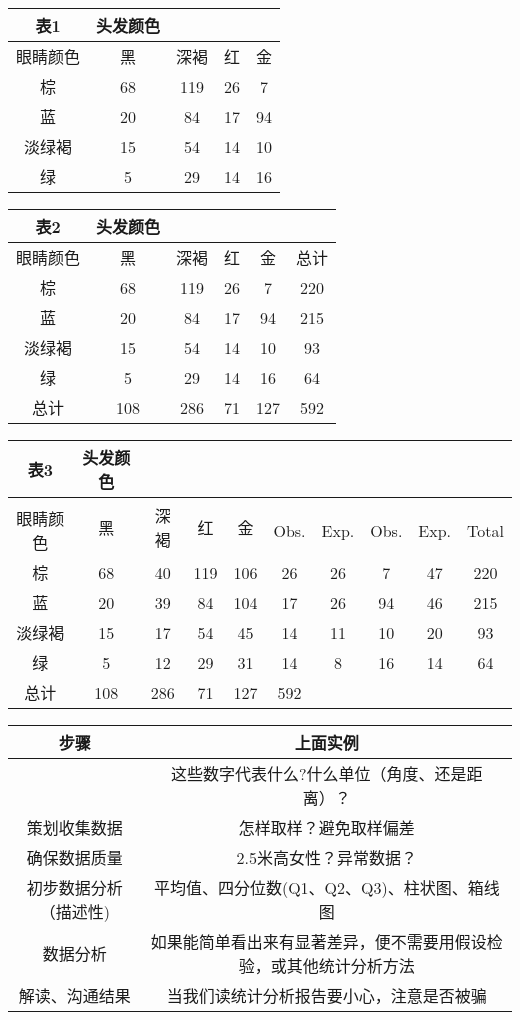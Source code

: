 \documentclass{book}        %
\begin{document}
\begin{tabular}{|c|c|c|c|c|}
\hline
表1&\multirow{4}{*}{头发颜色 }\\
\hline
眼睛颜色&黑&深褐&红&金\\
\hline
棕&68&119&26&7\\
\hline
蓝&20&84&17&94\\
\hline
淡绿褐&15&54&14&10\\
\hline
绿&5&29&14&16\\
\hline
\end{tabular}


\begin{tabular}{|c|c|c|c|c|c|}
\hline
表2&\multirow{5}{*}{头发颜色 }\\
\hline
眼睛颜色&黑&深褐&红&金&总计\\
\hline
棕&68&119&26&7&220\\
\hline
蓝&20&84&17&94&215\\
\hline
淡绿褐&15&54&14&10&93\\
\hline
绿&5&29&14&16&64\\
\hline
总计&108&286&71&127&592\\
\hline
\end{tabular}



\begin{tabular}{|c|c|c|c|c|c|c|c|c|c|}
\hline
表3&\multirow{8}{*}{头发颜色 }&\:\\
\hline
\:&\multirow{2}{*}{黑}&\multirow{2}{*}{深褐}&\multirow{2}{*}{红}&\multirow{2}{*}{金}&\:\\
\hline
眼睛颜色&Obs.&Exp.&Obs.&Exp.&Obs.&Exp.&Obs.&Exp.&Total\\
\hline
棕&68&40&119&106&26&26&7&47&220\\
\hline
蓝&20&39&84&104&17&26&94&46&215\\
\hline
淡绿褐&15&17&54&45&14&11&10&20&93\\
\hline
绿&5&12&29&31&14&8&16&14&64\\
\hline
总计&\multirow{2}{*}{108}&\multirow{2}{*}{286}&\multirow{2}{*}{71}&\multirow{2}{*}{127}&592\\
\hline
\end{tabular}


\begin{tabular}{|c|c|}
\hline
步骤&上面实例 \\
\hline
\:&这些数字代表什么?什么单位（角度、还是距离）？ \\
\hline
策划收集数据&怎样取样？避免取样偏差 \\
\hline
确保数据质量&2.5米高女性？异常数据？ \\
\hline
初步数据分析（描述性)&平均值、四分位数(Q1、Q2、Q3)、柱状图、箱线图 \\
\hline
数据分析&如果能简单看出来有显著差异，便不需要用假设检验，或其他统计分析方法\\
\hline
解读、沟通结果&当我们读统计分析报告要小心，注意是否被骗 \\
\hline
\end{tabular}
\end{document}
